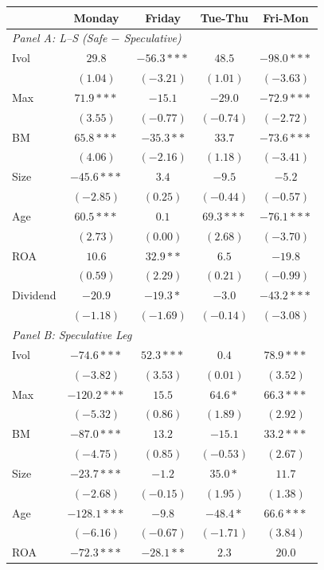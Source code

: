\centering
\footnotesize
\begin{tabular}{l c c c c}
\toprule
 & Monday & Friday & Tue-Thu & Fri-Mon \\
\midrule
\multicolumn{5}{l}{\textit{Panel A: L--S (Safe $-$ Speculative)}} \\
Ivol & $29.8$ & $-56.3***$ & $48.5$ & $-98.0***$ \\
 & $(1.04)$ & $(-3.21)$ & $(1.01)$ & $(-3.63)$ \\
Max & $71.9***$ & $-15.1$ & $-29.0$ & $-72.9***$ \\
 & $(3.55)$ & $(-0.77)$ & $(-0.74)$ & $(-2.72)$ \\
BM & $65.8***$ & $-35.3**$ & $33.7$ & $-73.6***$ \\
 & $(4.06)$ & $(-2.16)$ & $(1.18)$ & $(-3.41)$ \\
Size & $-45.6***$ & $3.4$ & $-9.5$ & $-5.2$ \\
 & $(-2.85)$ & $(0.25)$ & $(-0.44)$ & $(-0.57)$ \\
Age & $60.5***$ & $0.1$ & $69.3***$ & $-76.1***$ \\
 & $(2.73)$ & $(0.00)$ & $(2.68)$ & $(-3.70)$ \\
ROA & $10.6$ & $32.9**$ & $6.5$ & $-19.8$ \\
 & $(0.59)$ & $(2.29)$ & $(0.21)$ & $(-0.99)$ \\
Dividend & $-20.9$ & $-19.3*$ & $-3.0$ & $-43.2***$ \\
 & $(-1.18)$ & $(-1.69)$ & $(-0.14)$ & $(-3.08)$ \\
\midrule
\multicolumn{5}{l}{\textit{Panel B: Speculative Leg}} \\
Ivol & $-74.6***$ & $52.3***$ & $0.4$ & $78.9***$ \\
 & $(-3.82)$ & $(3.53)$ & $(0.01)$ & $(3.52)$ \\
Max & $-120.2***$ & $15.5$ & $64.6*$ & $66.3***$ \\
 & $(-5.32)$ & $(0.86)$ & $(1.89)$ & $(2.92)$ \\
BM & $-87.0***$ & $13.2$ & $-15.1$ & $33.2***$ \\
 & $(-4.75)$ & $(0.85)$ & $(-0.53)$ & $(2.67)$ \\
Size & $-23.7***$ & $-1.2$ & $35.0*$ & $11.7$ \\
 & $(-2.68)$ & $(-0.15)$ & $(1.95)$ & $(1.38)$ \\
Age & $-128.1***$ & $-9.8$ & $-48.4*$ & $66.6***$ \\
 & $(-6.16)$ & $(-0.67)$ & $(-1.71)$ & $(3.84)$ \\
ROA & $-72.3***$ & $-28.1**$ & $2.3$ & $20.0$ \\

\end{tabular}
